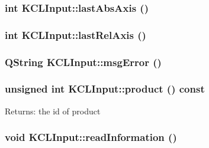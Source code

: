 \hypertarget{class_k_c_l_input_c5a8a2c8264e7ff8d4567057d2ae12c5}{
\subsubsection[{lastAbsAxis}]{\setlength{\rightskip}{0pt plus 5cm}int KCLInput::lastAbsAxis ()}}
\label{class_k_c_l_input_c5a8a2c8264e7ff8d4567057d2ae12c5}


\hypertarget{class_k_c_l_input_8414ad0259d97aed6a00658b7dd94d45}{
\subsubsection[{lastRelAxis}]{\setlength{\rightskip}{0pt plus 5cm}int KCLInput::lastRelAxis ()}}
\label{class_k_c_l_input_8414ad0259d97aed6a00658b7dd94d45}


\hypertarget{class_k_c_l_input_90dc7de6adce9a4eeda72d57491137f3}{
\subsubsection[{msgError}]{\setlength{\rightskip}{0pt plus 5cm}QString KCLInput::msgError ()}}
\label{class_k_c_l_input_90dc7de6adce9a4eeda72d57491137f3}


\hypertarget{class_k_c_l_input_024e32ca1e69548cf8c88f9cdf0c846a}{
\subsubsection[{product}]{\setlength{\rightskip}{0pt plus 5cm}unsigned int KCLInput::product () const}}
\label{class_k_c_l_input_024e32ca1e69548cf8c88f9cdf0c846a}


\begin{Desc}
\item[Returns:]the id of product \end{Desc}
\hypertarget{class_k_c_l_input_33e1fd26c084040a728cabf03e445893}{
\subsubsection[{readInformation}]{\setlength{\rightskip}{0pt plus 5cm}void KCLInput::readInformation ()}}
\label{class_k_c_l_input_33e1fd26c084040a728cabf03e445893}


